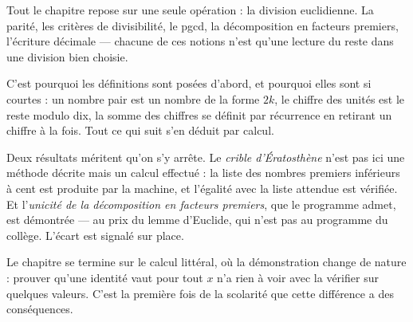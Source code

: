 Tout le chapitre repose sur une seule opération : la division euclidienne. La parité, les
critères de divisibilité, le pgcd, la décomposition en facteurs premiers, l'écriture
décimale — chacune de ces notions n'est qu'une lecture du reste dans une division bien
choisie.

C'est pourquoi les définitions sont posées d'abord, et pourquoi elles sont si courtes : un
nombre pair est un nombre de la forme $2k$, le chiffre des unités est le reste modulo dix,
la somme des chiffres se définit par récurrence en retirant un chiffre à la fois. Tout ce
qui suit s'en déduit par calcul.

Deux résultats méritent qu'on s'y arrête. Le \emph{crible d'Ératosthène} n'est pas ici une
méthode décrite mais un calcul effectué : la liste des nombres premiers inférieurs à cent
est produite par la machine, et l'égalité avec la liste attendue est vérifiée. Et
l'\emph{unicité de la décomposition en facteurs premiers}, que le programme admet, est
démontrée — au prix du lemme d'Euclide, qui n'est pas au programme du collège. L'écart est
signalé sur place.

Le chapitre se termine sur le calcul littéral, où la démonstration change de nature :
prouver qu'une identité vaut pour tout $x$ n'a rien à voir avec la vérifier sur quelques
valeurs. C'est la première fois de la scolarité que cette différence a des conséquences.
